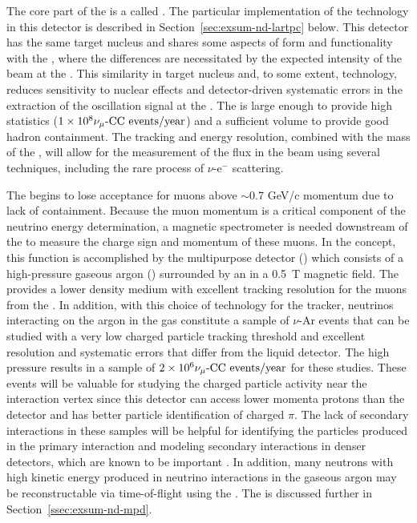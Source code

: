 The core part of the   is a  called .  The particular implementation of the  technology in this detector is described in Section~\ref{sec:exsum-nd-lartpc} below.  
This detector has the same target nucleus and shares some aspects of form and functionality with the , where the differences are necessitated by the expected intensity of the beam at the .  This similarity in target nucleus and, to some extent, technology, reduces sensitivity to nuclear effects and detector-driven systematic errors in the extraction of the oscillation signal at the  .  The  is large enough to provide high statistics ($\num{1e8}{\numu \text{-CC events/year}}$) and a sufficient volume to provide good hadron containment.  The tracking and energy resolution, combined with the mass of the , will allow for the measurement of the flux in the beam using several techniques, including the rare process of $\nu$-e$^{-}$ scattering.

The  begins to lose acceptance for muons above $\sim$0.7 GeV/c momentum due to lack of containment.  Because the muon momentum is a critical component of the neutrino energy determination, a magnetic spectrometer is needed downstream of the  to measure the charge sign and momentum of these muons.  In the   concept, this function is accomplished by the multipurpose detector () which consists of a high-pressure gaseous argon  () surrounded by an  in a \SI{0.5}{T} magnetic field. The  provides a lower density medium with excellent tracking resolution for the muons from the .  In addition, with this choice of technology for the tracker, neutrinos interacting on the argon in the gas  constitute a sample of $\nu$-Ar events that can be studied with a very low charged particle tracking threshold and excellent resolution and systematic errors that differ from the liquid detector. The high pressure results in a sample of $\num{2e6}{\numu \text{-CC events/year}}$ for these studies. These events will be valuable for studying the charged particle activity near the interaction vertex since this detector can access lower momenta protons than the  detector and has better particle identification of charged $\pi$.  The lack of secondary interactions in these samples will be helpful for identifying the particles produced in the primary interaction and modeling secondary interactions in denser detectors, which are known to be important \cite{Friedland:2018vry}.
In addition, many neutrons with high kinetic energy produced in neutrino interactions in the gaseous argon may be reconstructable via time-of-flight using the .    
The  is  discussed further in Section~\ref{ssec:exsum-nd-mpd}.

